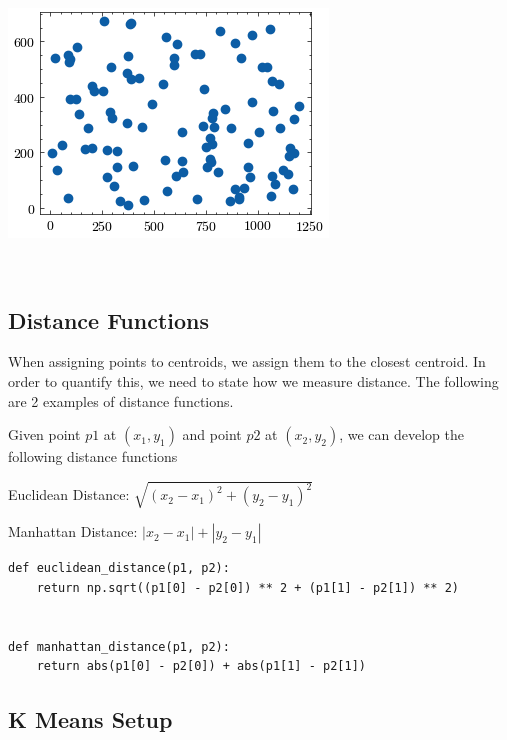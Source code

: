 \documentclass[openany]{book}
\begin{document}
    \begin{center}
    \includegraphics[width=\textwidth]{combined_files/combined_33_1.png}
    \end{center}
    { \hspace*{\fill} \\}
    
    \subsection{Distance Functions}\label{distance-functions}

When assigning points to centroids, we assign them to the closest
centroid. In order to quantify this, we need to state how we measure
distance. The following are 2 examples of distance functions.

Given point \(p1\) at \((x_1, y_1)\) and point \(p2\) at \((x_2, y_2)\),
we can develop the following distance functions

Euclidean Distance: \(\sqrt{(x_2-x_1)^2 + (y_2-y_1)^2}\)

Manhattan Distance: \(|x_2-x_1| + |y_2-y_1|\)

\begin{tcolorbox}
\tiny
\begin{verbatim}
def euclidean_distance(p1, p2):
    return np.sqrt((p1[0] - p2[0]) ** 2 + (p1[1] - p2[1]) ** 2)


def manhattan_distance(p1, p2):
    return abs(p1[0] - p2[0]) + abs(p1[1] - p2[1])
\end{verbatim}
\end{tcolorbox}

    \subsection{K Means Setup}\label{k-means-setup}
\end{document}

